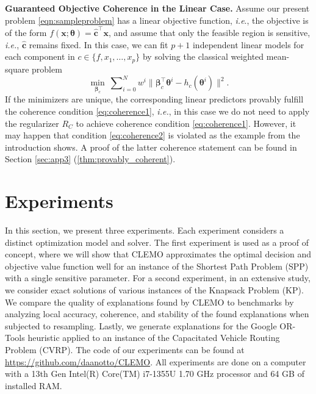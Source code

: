 \documentclass{article}
\theoremstyle{plain}
\theoremstyle{definition}
\theoremstyle{remark}
\begin{document}
\textbf{Guaranteed Objective Coherence in the Linear Case.} Assume our present problem \eqref{eqn:sampleproblem} has a linear objective function, \textit{i.e}., the objective is of the form $f(\bm{x};\bm{\theta})=\bm{\hat c}^\intercal \bm{x}$,
and assume that only the feasible region is sensitive, \textit{i.e.}, $\bm{\hat c}$ remains fixed. In this case, we can fit $p+1$ independent linear models for each component in  $c\in\{ f, x_1,\ldots ,x_p\}$ by solving the classical weighted mean-square problem
\[\min_{\bm{\beta}_{c}} \ \sum\nolimits_{i=0}^{N} w^i\| \bm{\beta}_{c}^\intercal\bm{\theta}^i-h_c(\bm{\theta}^i)\|^2. \]
If the minimizers are unique, the corresponding linear predictors provably fulfill the coherence condition \eqref{eq:coherence1}, \textit{i.e.}, in this case we do not need to apply the regularizer $R_C$ to achieve coherence condition \eqref{eq:coherence1}. However, it may happen that condition \eqref{eq:coherence2} is violated as the example from the introduction shows. A proof of the latter coherence statement can be found in Section \ref{sec:app3} (\cref{thm:provably_coherent}).

\section{Experiments}\label{sec:Experiments}
In this section, we present three experiments. Each experiment considers a distinct optimization model and solver. The first experiment is used as a proof of concept, where we will show that CLEMO approximates the optimal decision and objective value function well for an instance of the Shortest Path Problem (SPP) with a single sensitive parameter. For a second experiment, in an extensive study, we consider exact solutions of various instances of the Knapsack Problem (KP). We compare the quality of explanations found by CLEMO to benchmarks by analyzing local accuracy, coherence, and stability of the found explanations when subjected to resampling. Lastly, we generate explanations for the Google OR-Tools heuristic \cite{ortools_routing} applied to an instance of the Capacitated Vehicle Routing Problem (CVRP). The code of our experiments can be found at \url{https://github.com/daanotto/CLEMO}. All experiments are done on a computer with a 13th Gen Intel(R) Core(TM) i7-1355U 1.70 GHz processor and 64 GB of installed RAM.
\end{document}
